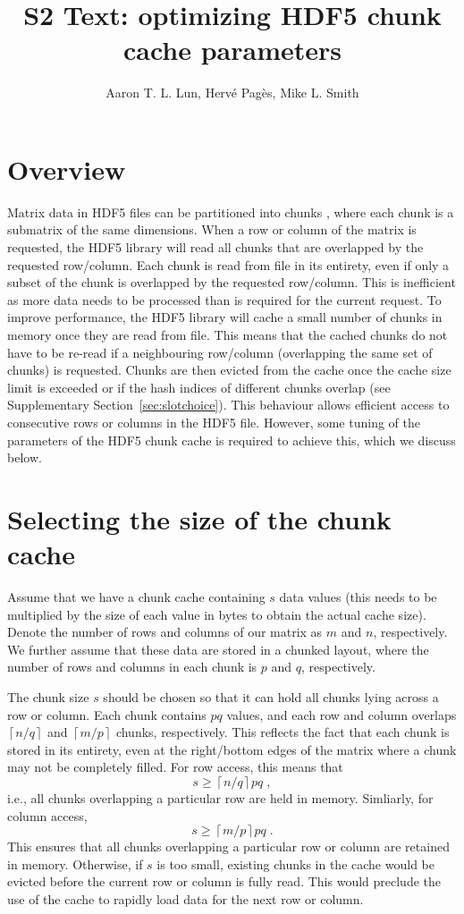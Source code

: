 \documentclass{article}
\title{S2 Text: optimizing HDF5 chunk cache parameters}
\author{Aaron T. L. Lun, Herv\'e Pag\`es, Mike L. Smith}
\providecommand{\myceil}[1]{\left \lceil #1 \right \rceil }
\begin{document}
\maketitle

\section{Overview}
Matrix data in HDF5 files can be partitioned into chunks \cite{hdf5chunk}, where each chunk is a submatrix of the same dimensions.
When a row or column of the matrix is requested, the HDF5 library will read all chunks that are overlapped by the requested row/column.
Each chunk is read from file in its entirety, even if only a subset of the chunk is overlapped by the requested row/column.
This is inefficient as more data needs to be processed than is required for the current request.
To improve performance, the HDF5 library will cache a small number of chunks in memory once they are read from file.
This means that the cached chunks do not have to be re-read if a neighbouring row/column (overlapping the same set of chunks) is requested.
Chunks are then evicted from the cache once the cache size limit is exceeded or if the hash indices of different chunks overlap (see Supplementary Section~\ref{sec:slotchoice}).
This behaviour allows efficient access to consecutive rows or columns in the HDF5 file.
However, some tuning of the parameters of the HDF5 chunk cache is required to achieve this, which we discuss below.

\section{Selecting the size of the chunk cache}
Assume that we have a chunk cache containing $s$ data values (this needs to be multiplied by the size of each value in bytes to obtain the actual cache size).
Denote the number of rows and columns of our matrix as $m$ and $n$, respectively. 
We further assume that these data are stored in a chunked layout, where the number of rows and columns in each chunk is $p$ and $q$, respectively.

The chunk size $s$ should be chosen so that it can hold all chunks lying across a row or column.
Each chunk contains $pq$ values, and each row and column overlaps $\myceil{n/q}$ and $\myceil{m/p}$ chunks, respectively.
This reflects the fact that each chunk is stored in its entirety, even at the right/bottom edges of the matrix where a chunk may not be completely filled.
For row access, this means that 
\begin{equation}
s \ge \myceil{n/q}pq \;, 
\end{equation}
i.e., all chunks overlapping a particular row are held in memory. Simliarly, for column access, 
\begin{equation}
s \ge \myceil{m/p}pq \;.
\end{equation}
This ensures that all chunks overlapping a particular row or column are retained in memory.
Otherwise, if $s$ is too small, existing chunks in the cache would be evicted before the current row or column is fully read.
This would preclude the use of the cache to rapidly load data for the next row or column.
\end{document}
